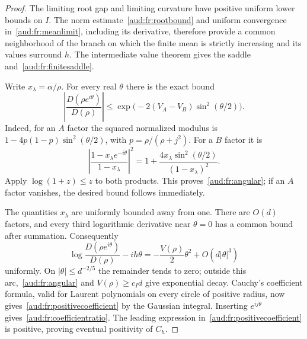 \begin{proof}
The limiting root gap and limiting curvature have positive uniform lower bounds on $I$. The norm estimate~\eqref{aud:fr:rootbound} and uniform convergence in~\eqref{aud:fr:meanlimit}, including its derivative, therefore provide a common neighborhood of the branch on which the finite mean is strictly increasing and its values surround $h$. The intermediate value theorem gives the saddle and~\eqref{aud:fr:finitesaddle}.

Write $x_\lambda=\alpha/\rho$. For every real $\theta$ there is the exact bound
\begin{equation}\label{aud:fr:angular}
 \left|\frac{D(\rho e^{i\theta})}{D(\rho)}\right|
 \le\exp\bigl(-2(V_A-V_B)\sin^2(\theta/2)\bigr).
\end{equation}
Indeed, for an $A$ factor the squared normalized modulus is $1-4p(1-p)\sin^2(\theta/2)$, with $p=\rho/(\rho+j^2)$. For a $B$ factor it is
\[
 \left|\frac{1-x_\lambda e^{-i\theta}}{1-x_\lambda}\right|^2
 =1+\frac{4x_\lambda\sin^2(\theta/2)}{(1-x_\lambda)^2}.
\]
Apply $\log(1+z)\le z$ to both products. This proves~\eqref{aud:fr:angular}; if an $A$ factor vanishes, the desired bound follows immediately.

The quantities $x_\lambda$ are uniformly bounded away from one. There are $O(d)$ factors, and every third logarithmic derivative near $\theta=0$ has a common bound after summation. Consequently
\[
 \log\frac{D(\rho e^{i\theta})}{D(\rho)}-ih\theta
 =-\frac{V(\rho)}2\theta^2+O(d|\theta|^3)
\]
uniformly. On $|\theta|\le d^{-2/5}$ the remainder tends to zero; outside this arc,~\eqref{aud:fr:angular} and $V(\rho)\ge c_I d$ give exponential decay. Cauchy's coefficient formula, valid for Laurent polynomials on every circle of positive radius, now gives~\eqref{aud:fr:positivecoefficient} by the Gaussian integral. Inserting $e^{ij\theta}$ gives~\eqref{aud:fr:coefficientratio}. The leading expression in~\eqref{aud:fr:positivecoefficient} is positive, proving eventual positivity of $C_h$.
\end{proof}
